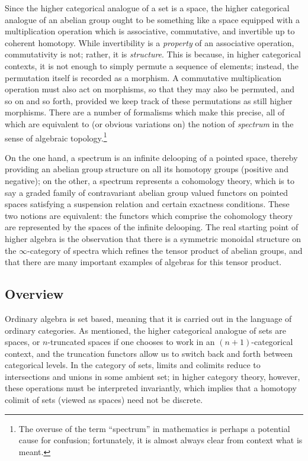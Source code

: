 \documentclass[12pt]{article}
\theoremstyle{definition}
\renewcommand{\i}{\infty}
\begin{document}
Since the higher categorical analogue of a set is a space, the higher categorical analogue of an abelian group ought to be something like a space equipped with a multiplication operation which is associative, commutative, and invertible up to coherent homotopy.
While invertibility is a {\em property} of an associative operation, commutativity is not; rather, it is {\em structure}.
This is because, in higher categorical contexts, it is not enough to simply permute a sequence of elements; instead, the permutation itself is recorded as a morphism.
A commutative multiplication operation must also act on morphisms, so that they may also be permuted, and so on and so forth, provided we keep track of these permutations as still higher morphisms.
There are a number of formalisms which make this precise, all of which are equivalent to (or obvious variations on) the notion of {\em spectrum} in the sense of algebraic topology.\footnote{The overuse of the term ``spectrum'' in mathematics is perhaps a potential cause for confusion; fortunately, it is almost always clear from context what is meant.}


On the one hand, a spectrum is an infinite delooping of a pointed space, thereby providing an abelian group structure on all its homotopy groups (positive and negative); on the other, a spectrum represents a cohomology theory, which is to say a graded family of contravariant abelian group valued functors on pointed spaces satisfying a suspension relation and certain exactness conditions.  These two notions are equivalent: the  functors which comprise the cohomology theory are represented by the spaces of the infinite delooping.
The real starting point of higher algebra is the observation that there is a symmetric monoidal structure on the $\i$-category of spectra which refines the tensor product of abelian groups, and that there are many important examples of algebras for this tensor product.


\subsection{Overview}


Ordinary algebra is set based, meaning that it is carried out in the language of ordinary categories.
As mentioned, the higher categorical analogue of sets are spaces, or $n$-truncated spaces if one chooses to work in an $(n+1)$-categorical context, and the truncation functors allow us to switch back and forth between categorical levels.
In the category of sets, limits and colimits reduce to intersections and unions in some ambient set; in higher category theory, however, these operations must be interpreted invariantly, which implies that a homotopy colimit of sets (viewed as spaces) need not be discrete.
\end{document}
